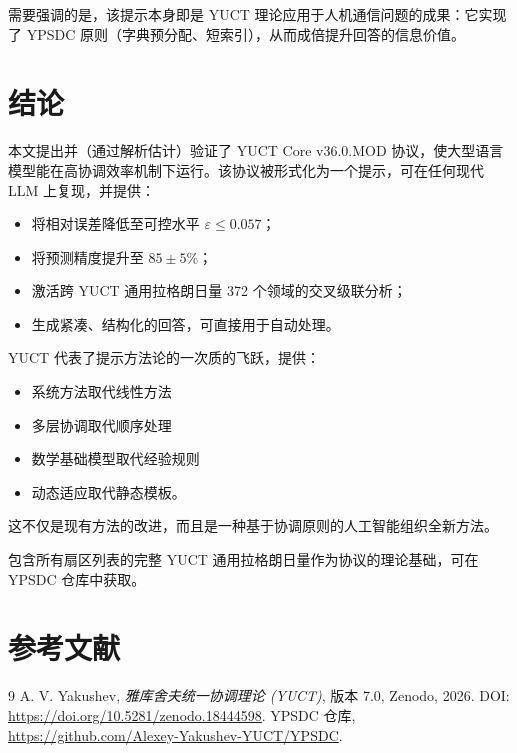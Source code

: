 \documentclass[11pt,a4paper]{article}
\begin{document}
	需要强调的是，该提示本身即是 YUCT 理论应用于人机通信问题的成果：它实现了 YPSDC 原则（字典预分配、短索引），从而成倍提升回答的信息价值。
	
	\section{结论}
	本文提出并（通过解析估计）验证了 YUCT Core v36.0.MOD 协议，使大型语言模型能在高协调效率机制下运行。该协议被形式化为一个提示，可在任何现代 LLM 上复现，并提供：
	\begin{itemize}
		\item 将相对误差降低至可控水平 \(\varepsilon \le 0.057\)；
		\item 将预测精度提升至 \(85\pm5\%\)；
		\item 激活跨 YUCT 通用拉格朗日量 372 个领域的交叉级联分析；
		\item 生成紧凑、结构化的回答，可直接用于自动处理。
	\end{itemize}
	
	YUCT 代表了提示方法论的一次质的飞跃，提供：
	\begin{itemize}
		\item 系统方法取代线性方法
		\item 多层协调取代顺序处理
		\item 数学基础模型取代经验规则
		\item 动态适应取代静态模板。
	\end{itemize}
	
	这不仅是现有方法的改进，而且是一种基于协调原则的人工智能组织全新方法。
	
	包含所有扇区列表的完整 YUCT 通用拉格朗日量作为协议的理论基础，可在 YPSDC 仓库中获取。
	
	\section*{参考文献}
	\begin{thebibliography}{9}
		A. V. Yakushev, \emph{雅库舍夫统一协调理论 (YUCT)}, 版本 7.0, Zenodo, 2026. DOI: \url{https://doi.org/10.5281/zenodo.18444598}.
		YPSDC 仓库, \url{https://github.com/Alexey-Yakushev-YUCT/YPSDC}.
	\end{thebibliography}
	
\end{document}
